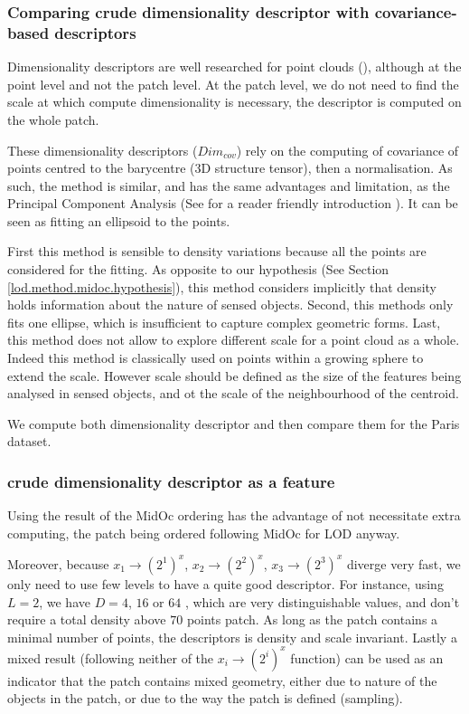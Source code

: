				
		\subsubsection{Comparing crude dimensionality descriptor with covariance-based descriptors}
		
		Dimensionality descriptors are  well researched for point clouds (\cite{Demantke2014, Weinmann2015}), 
		although at the point level and not the patch level.
		At the patch level, we do not need to find the scale at which compute dimensionality is necessary,
		the descriptor is computed on the whole patch.
		
		These dimensionality descriptors ($Dim_{cov}$) rely on the computing of covariance of points centred to the barycentre (3D structure tensor), then a normalisation.
		As such, the method is similar, and has the same advantages and limitation, as the Principal Component Analysis (See \cite{Shlens2014} for a reader friendly introduction ).
		It can be seen as fitting an ellipsoid to the points.
		
		First this method is sensible to density variations because all the points are considered for the fitting. 
		As opposite to our hypothesis (See Section \ref{lod.method.midoc.hypothesis}),
		this method considers implicitly that density holds information about the nature of sensed objects. 
		Second, this methods only fits one ellipse, which is insufficient to capture complex geometric forms. 
		Last, this method does not allow to explore different scale for a point cloud as a whole. Indeed this method is classically used on points within a growing sphere to extend the scale. However scale should be defined as the size of the features being analysed in sensed objects, and ot the scale of the neighbourhood of the centroid.
		
		We compute both dimensionality descriptor and then compare them for the Paris dataset.
		
		\subsubsection{crude dimensionality descriptor as a feature}

		Using the result of the MidOc ordering has the advantage of not necessitate extra computing,
		the patch being ordered following MidOc for LOD anyway.
		
		Moreover, because $x_1 \rightarrow (2^1)^x$,
		$x_2 \rightarrow (2^2)^x$, $x_3 \rightarrow (2^3)^x$ diverge very fast,
		we only need to use few levels to have a quite good descriptor.
		For instance, using $L=2$, we have $D=4$, $16$ or $64$ , which are very distinguishable values, and don't require a total density above $70$ points \per patch.  
		As long as the patch contains a minimal number of points, the descriptors is density and scale invariant.
		Lastly a mixed result (following neither of the $x_i \rightarrow (2^i)^x$ function) can be used as an indicator that the patch contains mixed geometry, either due to nature of the objects in the patch, or due to the way the patch is defined (sampling).
		
